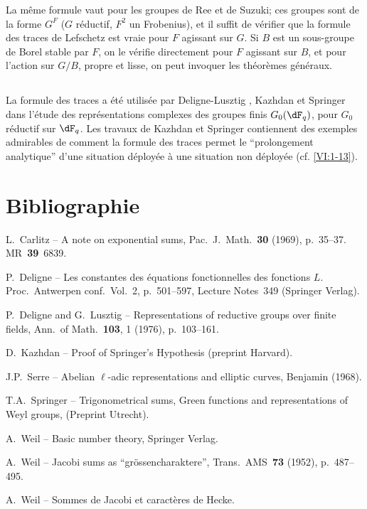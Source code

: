 \documentclass[oneside]{book}
\newcounter{char}
\theoremstyle{sga-source}
\theoremstyle{sga-source-dash}
\theoremstyle{sga-source-dotdash}
\theoremstyle{sga-source-number-note-dash}
\theoremstyle{sga-source-note-number-dotdash}
\theoremstyle{sga-source-example-dotdash}
\theoremstyle{sga-source-inline-number}
\theoremstyle{sga-source-bare-number}
\theoremstyle{sga-source}
\newcommand{\PrintPage}[1]{}\newcommand{\MathPage}[1]{}\newcommand{\PrintCite}[2]{#1}\newcommand{\var}[3]{#2}
\begin{document}
\PrintPage{231}
La même formule vaut pour les groupes de Ree et de Suzuki; ces groupes sont 
de la forme $G^F$ ($G$ réductif, $F^2$ un Frobenius), et il suffit de 
vérifier que la formule des traces de Lefschetz est vraie pour $F$ agissant 
sur $G$. Si $B$ est un sous-groupe de Borel stable par $F$, on le vérifie 
directement pour $F$ agissant sur $B$, et pour l'action sur $G/B$, propre et 
lisse, on peut invoquer les théorèmes généraux. 





\subsection{}\label{VI:8-3}

La formule des traces a été utilisée par Deligne-Lusztig \cite{dl76}, 
Kazhdan \cite{ka77} et Springer \cite{sp76} dans l'étude des 
représentations complexes des groupes finis $G_0(\dF_q)$, pour $G_0$ 
réductif sur $\dF_q$. Les travaux de Kazhdan et Springer contiennent des 
exemples admirables de comment la formule des traces permet le ``prolongement 
analytique'' d'une situation déployée à une situation non déployée 
(cf. \ref{VI:1-13}). 







\PrintPage{232}
\section*{Bibliographie}
\begin{enumerate}[{[}1{]}]
\item L.~Carlitz -- A note on exponential sums, Pac.~J.~Math.~\textbf{30} (1969), p.~35--37. MR~\textbf{39}~6839.
\item P.~Deligne -- Les constantes des équations fonctionnelles des fonctions $L$.
Proc.~Antwerpen conf.~Vol.~2, p.~501--597, Lecture Notes~349 (Springer Verlag).
\item P.~Deligne and G.~Lusztig -- Representations of reductive groups over finite fields,
Ann.~of Math.~\textbf{103}, 1 (1976), p.~103--161.
\item D.~Kazhdan -- Proof of Springer's Hypothesis (preprint Harvard).
\item J.P.~Serre -- Abelian $\ell$-adic representations and elliptic curves, Benjamin (1968).
\item T.A.~Springer -- Trigonometrical sums, Green functions and representations of
\var{Weil}{Weyl}{S45-ASTRA-S-0049} groups, (Preprint Utrecht).
\item A.~Weil -- Basic number theory, Springer Verlag.
\item A.~Weil -- Jacobi sums as ``gr\"ossencharaktere'', Trans.~AMS~\textbf{73} (1952), p.~487--495.
\item A.~Weil -- Sommes de Jacobi et caractères de Hecke.
\end{enumerate}
\end{document}
